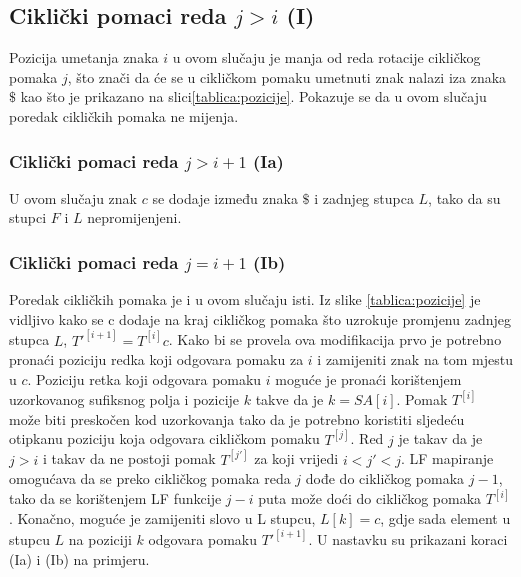 \documentclass{ferseminar}
\begin{document}
\subsection{Ciklički pomaci reda $j>i$ (I)}
Pozicija umetanja znaka $i$ u ovom slučaju je manja od reda rotacije cikličkog pomaka $j$, što znači da će se u cikličkom pomaku umetnuti znak nalazi iza znaka $\$$ kao što je prikazano na slici\ref{tablica:pozicije}. Pokazuje se da u ovom slučaju poredak cikličkih pomaka ne mijenja. 

\subsubsection{Ciklički pomaci reda $j>i+1$ (Ia)}
U ovom slučaju znak $c$ se dodaje između znaka $\$$ i zadnjeg stupca $L$, tako da su stupci $F$ i $L$ nepromijenjeni.

\subsubsection{Ciklički pomaci reda $j=i+1$ (Ib)}
Poredak cikličkih pomaka je i u ovom slučaju isti. Iz slike \ref{tablica:pozicije} je vidljivo kako se c dodaje na kraj cikličkog pomaka što uzrokuje promjenu zadnjeg stupca $L$, $T'^{[i+1]}=T^[i]c$. Kako bi se provela ova modifikacija prvo je potrebno pronaći poziciju redka koji odgovara pomaku za $i$ i zamijeniti znak na tom mjestu u $c$. Poziciju retka koji odgovara pomaku  $i$ moguće je pronaći korištenjem uzorkovanog sufiksnog polja i pozicije $k$ takve da je $k=SA[i]$. Pomak $T^{[i]}$ može biti preskočen kod uzorkovanja tako da je potrebno koristiti sljedeću otipkanu poziciju koja odgovara cikličkom pomaku $T^{[j]}$. Red $j$ je takav da je $j>i$ i takav da ne postoji pomak $T^{[j']}$ za koji vrijedi $i<j'<j$. LF mapiranje omogućava da se preko cikličkog pomaka reda $j$ dođe do cikličkog pomaka $j-1$, tako da se korištenjem LF funkcije $j-i$ puta može doći do cikličkog pomaka $T^{[i]}$. Konačno, moguće je zamijeniti slovo u L stupcu, $L[k]=c$, gdje sada element u stupcu $L$ na poziciji $k$ odgovara pomaku $T'^{[i+1]}$.
U nastavku su prikazani koraci (Ia) i (Ib) na primjeru.
\end{document}
